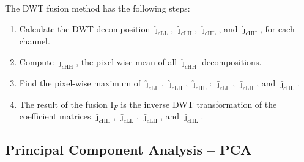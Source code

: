 \documentclass[journal]{IEEEtran}
\begin{document}
The DWT fusion method has the following steps:
\begin{enumerate}
\item Calculate the DWT decomposition $\bm{\widehat\jmath}_{c\text{LL}}$, $\bm{\widehat\jmath}_{c\text{LH}}$, $\bm{\widehat\jmath}_{c\text{HL}}$, and $\bm{\widehat\jmath}_{c\text{HH}}$, for each channel.
\item Compute $\bm{\bar\jmath}_{c\text{HH}}$, the pixel-wise mean of all $\bm{\widehat\jmath}_{c\text{HH}}$ decompositions.
\item Find the pixel-wise maximum of $\bm{\widehat\jmath}_{c\text{LL}}$, $\bm{\widehat\jmath}_{c\text{LH}}$, $\bm{\widehat\jmath}_{c\text{HL}}$: $\bm{\bar\jmath}_{c\text{LL}}$, $\bm{\bar\jmath}_{c\text{LH}}$, and $\bm{\bar\jmath}_{c\text{HL}}$.
\item The result of the fusion $\text{I}_F$ is the inverse DWT transformation of the coefficient matrices $\bm{\bar\jmath}_{c\text{HH}}$, $\bm{\bar\jmath}_{c\text{LL}}$, $\bm{\bar\jmath}_{c\text{LH}}$, and $\bm{\bar\jmath}_{c\text{HL}}$.
\end{enumerate}
\subsection{Principal Component Analysis -- PCA}
\end{document}
